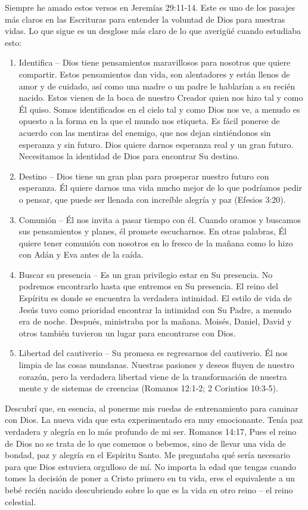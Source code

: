 \documentclass[twoside, 12pt]{book}
\begin{document}
Siempre he amado estos versos en Jeremías 29:11-14. Este es uno de los pasajes más claros en las Escrituras para entender la voluntad de Dios para nuestras vidas.
Lo que sigue es un desglose más claro de lo que averigüé cuando estudiaba esto:

\begin{enumerate}
	\item Identifica – Dios tiene pensamientos maravillosos para nosotros que quiere compartir. Estos pensamientos dan vida, son alentadores y están llenos de amor y de cuidado, así como una madre o un padre le hablarían a su recién nacido. Estos vienen de la boca de nuestro Creador quien nos hizo tal y como Él quiso. Somos identificados en el cielo tal y como Dios nos ve, a menudo es opuesto a la forma en la que el mundo nos etiqueta. Es fácil ponerse de acuerdo con las mentiras del enemigo, que nos dejan sintiéndonos sin esperanza y sin futuro. Dios quiere darnos esperanza real y un gran futuro. Necesitamos la identidad de Dios para encontrar Su destino.
	\item Destino – Dios tiene un gran plan para prosperar nuestro futuro con esperanza. Él quiere darnos una vida mucho mejor de lo que podríamos pedir o pensar, que puede ser llenada con increíble alegría y paz (Efesios 3:20).
	\item  Comunión – Él nos invita a pasar tiempo con él. Cuando oramos y buscamos sus pensamientos y planes, él promete escucharnos. En otras palabras, Él quiere tener comunión con nosotros en lo fresco de la mañana como lo hizo con Adán y Eva antes de la caída.
	\item Buscar su presencia – Es un gran privilegio estar en Su presencia. No podremos encontrarlo hasta que entremos en Su presencia. El reino del Espíritu es donde se encuentra la verdadera intimidad. El estilo de vida de Jesús tuvo como prioridad encontrar la intimidad con Su Padre, a menudo era de noche. Después, ministraba por la mañana. Moisés, Daniel, David y otros también tuvieron un lugar para encontrarse con Dios.
	\item Libertad del cautiverio – Su promesa es regresarnos del cautiverio. Él nos limpia de las cosas mundanas. Nuestras pasiones y deseos fluyen de nuestro corazón, pero la verdadera libertad viene de la transformación de nuestra mente y de sistemas de creencias (Romanos 12:1-2; 2 Corintios 10:3-5).
\end{enumerate}

Descubrí que, en esencia, al ponerme mis ruedas de entrenamiento para caminar con Dios. La nueva vida que esta experimentado era muy emocionante. Tenía paz verdadera y alegría en lo más profundo de mi ser. Romanos 14:17, Pues el reino de Dios no se trata de lo que comemos o bebemos, sino de llevar una vida de bondad, paz y alegría en el Espíritu Santo. Me preguntaba qué sería necesario para que Dios estuviera orgulloso de mí. No importa la edad que tengas cuando tomes la decisión de poner a Cristo primero en tu vida, eres el equivalente a un bebé recién nacido descubriendo sobre lo que es la vida en otro reino – el reino celestial.\\
\end{document}
